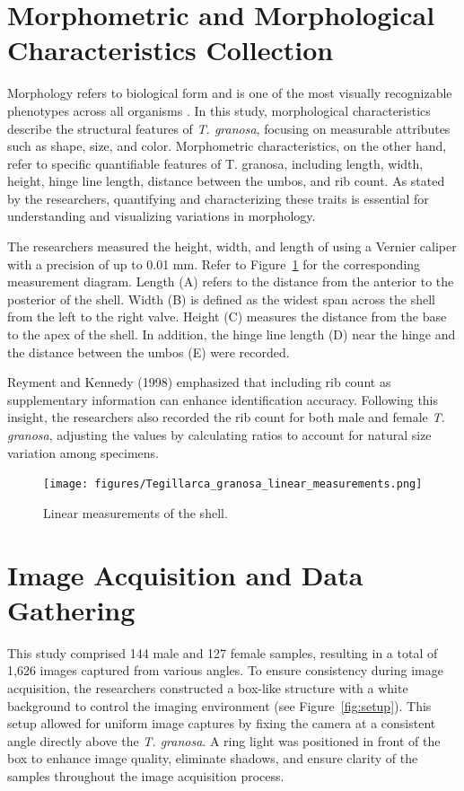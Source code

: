 \newpage
\section{Morphometric and Morphological Characteristics Collection}
\label{sec:morphochar}

Morphology refers to biological form and is one of the most visually recognizable phenotypes across all organisms \cite{tsutsumi2023}. In this study, morphological characteristics describe the structural features of \textit{T. granosa}, focusing on measurable attributes such as shape, size, and color. Morphometric characteristics, on the other hand, refer to specific quantifiable features of T. granosa, including length, width, height, hinge line length, distance between the umbos, and rib count. As stated by the researchers, quantifying and characterizing these traits is essential for understanding and visualizing variations in \Tgranosa morphology.

The researchers measured the height, width, and length of \Tgranosa using a Vernier caliper with a precision of up to 0.01 mm. Refer to Figure~\ref{fig:linear_measurements} for the corresponding measurement diagram. Length (A) refers to the distance from the anterior to the posterior of the shell. Width (B) is defined as the widest span across the shell from the left to the right valve. Height (C) measures the distance from the base to the apex of the shell. In addition, the hinge line length (D) near the hinge and the distance between the umbos (E) were recorded.

Reyment and Kennedy (1998) emphasized that including rib count as supplementary information can enhance identification accuracy. Following this insight, the researchers also recorded the rib count for both male and female \textit{T. granosa}, adjusting the values by calculating ratios to account for natural size variation among specimens.

\begin{figure}[!htbp]
	\centering
	\texttt{[image: figures/Tegillarca\_granosa\_linear\_measurements.png]}
	\caption{Linear measurements of the \Tgranosa shell.}
	\label{fig:linear_measurements}
\end{figure}

\section{Image Acquisition and Data Gathering}
\label{sec:imageprocess}

This study comprised 144 male and 127 female \Tgranosa samples, resulting in a total of 1,626 images captured from various angles. To ensure consistency during image acquisition, the researchers constructed a box-like structure with a white background to control the imaging environment (see Figure~\ref{fig:setup}). This setup allowed for uniform image captures by fixing the camera at a consistent angle directly above the \textit{T. granosa}. A ring light was positioned in front of the box to enhance image quality, eliminate shadows, and ensure clarity of the samples throughout the image acquisition process.

